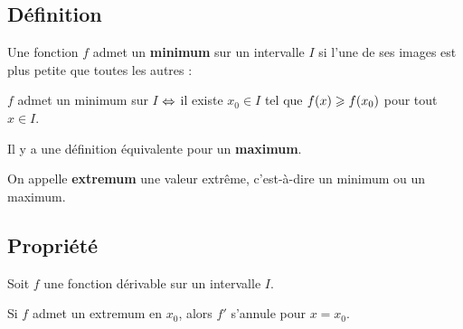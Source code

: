 \documentclass[a4paper,11pt]{article}
\begin{document}
\subsection{Définition}

\begin{cdefi}[s]
Une fonction $f$ admet un \textbf{minimum} sur un intervalle $I$ si l’une de ses images est plus petite que toutes les autres :

\hfill{}$f$ admet un minimum sur $I$ $\Leftrightarrow$ il existe $x_0 \in I$ tel que $f (x)  \geqslant f (x_0)$ pour tout $x \in I$.\hfill{}

\smallskip

Il y a une définition équivalente pour un \textbf{maximum}.

\smallskip

On appelle \textbf{extremum} une valeur extrême, c’est-à-dire un minimum ou un maximum.
\end{cdefi}

\subsection{Propriété}

\begin{cprop}
Soit $f$ une fonction dérivable sur un intervalle $I$.

Si $f$ admet un extremum en $x_0$, alors $f'$ s'annule pour $x=x_0$.
\end{cprop}
\end{document}
